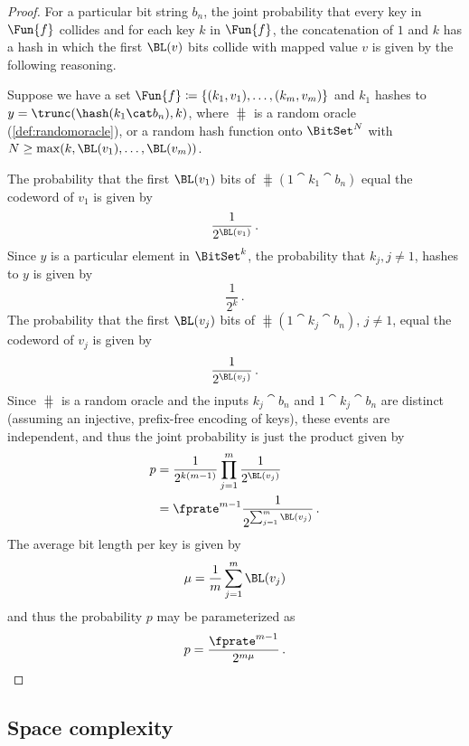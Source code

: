 \documentclass[ ../main.tex]{subfiles}
\begin{document}
\begin{proof}
For a particular bit string $b_n$, the joint probability that every key in $\Fun{f}$ collides and for each key $k$ in $\Fun{f}$, the concatenation of $1$ and $k$ has a hash in which the first $\BL(v)$ bits collide with mapped value $v$ is given by the following reasoning.

Suppose we have a set $\Fun{f} \coloneqq \{(k_1,v_1),\ldots,(k_m,v_m)\}$ and $k_1$ hashes to $y = \trunc(\hash(k_1 \cat b_n), k)$, where $\hash$ is a random oracle (\cref{def:randomoracle}), or a random hash function onto $\BitSet^N$ with $N \geq \max(k, \BL(v_1),\ldots,\BL(v_m))$.

The probability that the first $\BL(v_1)$ bits of $\hash(1 \cat k_1 \cat b_n)$ equal the codeword of $v_1$ is given by
\begin{equation}
    \frac{1}{2^{\BL(v_1)}}\,.
\end{equation}
Since $y$ is a particular element in $\BitSet^k$, the probability that $k_j, j \neq 1$, hashes to $y$ is given by
\begin{equation}
    \frac{1}{2^k}\,.
\end{equation}
The probability that the first $\BL(v_j)$ bits of $\hash(1 \cat k_j \cat b_n)$, $j \neq 1$, equal the codeword of $v_j$ is given by
\begin{equation}
    \frac{1}{2^{\BL(v_j)}}\,.
\end{equation}
Since $\hash$ is a random oracle and the inputs $k_j \cat b_n$ and $1 \cat k_j \cat b_n$ are distinct (assuming an injective, prefix-free encoding of keys), these events are independent, and thus the joint probability is just the product given by
\begin{align}
    p &= \frac{1}{2^{k(m-1)}} \prod_{j=1}^{m} \frac{1}{2^{\BL(v_j)}}\\
      &= \fprate^{m-1} \frac{1}{2^{\sum_{j=1}^{m} \BL(v_j)}}\,.
\end{align}
The average bit length per key is given by
\begin{equation}
    \mu = \frac{1}{m} \sum_{j=1}^{m} \BL(v_j)
\end{equation}
and thus the probability $p$ may be parameterized as
\begin{equation}
    p = \frac{\fprate^{m-1}}{2^{m \mu}}\,.
\end{equation}
\end{proof}

\subsection{Space complexity}
\label{sec:shm-space}
\end{document}
